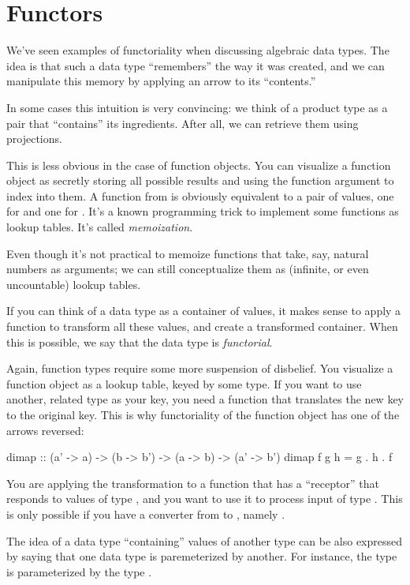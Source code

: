 \documentclass[DaoFP]{subfiles}
\begin{document}
\section{Functors}

We've seen examples of functoriality when discussing algebraic data types. The idea is that such a data type ``remembers'' the way it was created, and we can manipulate this memory by applying an arrow to its ``contents.'' 

In some cases this intuition is very convincing: we think of a product type as a pair that ``contains'' its ingredients. After all, we can retrieve them using projections. 

This is less obvious in the case of function objects. You can visualize a function object as secretly storing all possible results and using the function argument to index into them. A function from  is obviously equivalent to a pair of values, one for  and one for . It's a known programming trick to implement some functions as lookup tables. It's called \emph{memoization}. 

Even though it's not practical to memoize functions that take, say, natural numbers as arguments; we can still conceptualize them as (infinite, or even uncountable) lookup tables.

If you can think of a data type as a container of values, it makes sense to apply a function to transform all these values, and create a transformed container. When this is possible, we say that the data type is \emph{functorial}. 

Again, function types require some more suspension of disbelief. You visualize a function object as a lookup table, keyed by some type. If you want to use another, related type as your key, you need a function that translates the new key to the original key. This is why functoriality of the function object has one of the arrows reversed:
\begin{haskell}
dimap :: (a' -> a) -> (b -> b') -> (a -> b) -> (a' -> b')
dimap f g h = g . h . f
\end{haskell}
You are applying the transformation to a function  that has a ``receptor'' that responds to values of type , and you want to use it to process input of type . This is only possible if you have a converter from  to , namely .


The idea of a data type ``containing'' values of another type can be also expressed by saying that one data type is paremeterized by another. For instance, the type  is parameterized by the type . 
\end{document}
